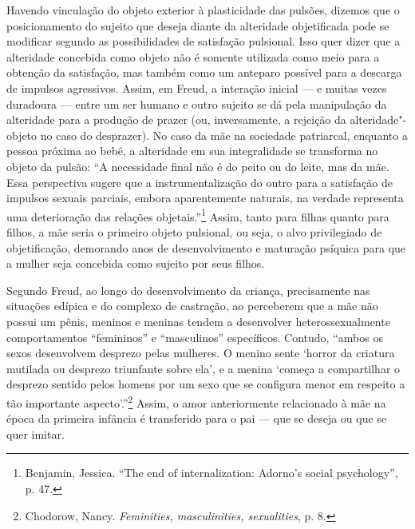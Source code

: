 Havendo vinculação do objeto exterior à plasticidade das pulsões,
dizemos que o posicionamento do sujeito que deseja diante da alteridade
objetificada pode se modificar segundo as possibilidades de satisfação
pulsional. Isso quer dizer que a alteridade concebida como objeto não é
somente utilizada como meio para a obtenção da satisfação, mas também
como um anteparo possível para a descarga de impulsos agressivos. Assim,
em Freud, a interação inicial --- e muitas vezes duradoura --- entre um
ser humano e outro sujeito se dá pela manipulação da alteridade para a
produção de prazer (ou, inversamente, a rejeição da alteridade"-objeto no
caso do desprazer). No caso da mãe na sociedade patriarcal, enquanto a
pessoa próxima ao bebê, a alteridade em sua integralidade se transforma
no objeto da pulsão: ``A necessidade final não é do peito ou do leite,
mas da mãe. Essa perspectiva sugere que a instrumentalização do outro
para a satisfação de impulsos sexuais parciais, embora aparentemente
naturais, na verdade representa uma deterioração das relações
objetais.''\footnote{Benjamin, Jessica. ``The end of internalization:
  Adorno's social psychology'', p. 47.} Assim, tanto para filhas quanto
para filhos, a mãe seria o primeiro objeto pulsional, ou seja, o alvo
privilegiado de objetificação, demorando anos de desenvolvimento e
maturação psíquica para que a mulher seja concebida como sujeito por
seus filhos.

Segundo Freud, ao longo do desenvolvimento da criança, precisamente nas
situações edípica e do complexo de castração, ao perceberem que a mãe
não possui um pênis, meninos e meninas tendem a desenvolver
heterossexualmente comportamentos ``femininos'' e ``masculinos''
específicos. Contudo, ``ambos os sexos desenvolvem desprezo pelas
mulheres. O menino sente `horror da criatura mutilada ou desprezo
triunfante sobre ela', e a menina `começa a compartilhar o desprezo
sentido pelos homens por um sexo que se configura menor em respeito a
tão importante aspecto'.''\footnote{Chodorow, Nancy. \emph{Feminities,
  masculinities, sexualities}, p. 8.} Assim, o amor anteriormente
relacionado à mãe na época da primeira infância é transferido para o pai
--- que se deseja ou que se quer imitar.

